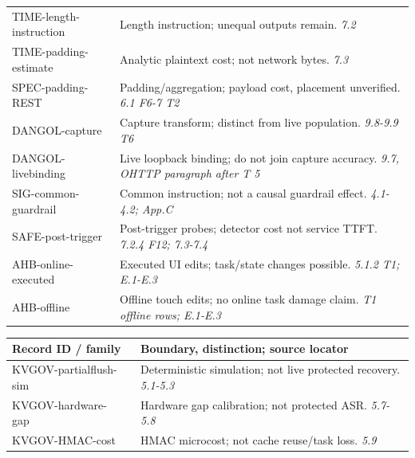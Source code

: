 \begin{table}[!t]
\begin{minipage}[t]{.492\textwidth}
\begin{tabularx}{\linewidth}{@{}p{.40\linewidth}X@{}}
TIME-\allowbreak{}length-\allowbreak{}instruction~\cite{timewilltell2024} & Length instruction; unequal outputs remain. \emph{7.2}\\
TIME-\allowbreak{}padding-\allowbreak{}estimate~\cite{timewilltell2024} & Analytic plaintext cost; not network bytes. \emph{7.3}\\
SPEC-\allowbreak{}padding-\allowbreak{}REST~\cite{wei2024speculation} & Padding/aggregation; payload cost, placement unverified. \emph{6.1 F6-7 T2}\\
DANGOL-\allowbreak{}capture~\cite{dangol2026workflow} & Capture transform; distinct from live population. \emph{9.8-9.9 T6}\\
DANGOL-\allowbreak{}livebinding~\cite{dangol2026workflow} & Live loopback binding; do not join capture accuracy. \emph{9.7, OHTTP paragraph after T 5}\\
SIG-\allowbreak{}common-\allowbreak{}guardrail~\cite{geng2026sigleak} & Common instruction; not a causal guardrail effect. \emph{4.1-4.2; App.C}\\
SAFE-\allowbreak{}post-\allowbreak{}trigger~\cite{chu2025safekv} & Post-trigger probes; detector cost not service TTFT. \emph{7.2.4 F12; 7.3-7.4}\\
AHB-\allowbreak{}online-\allowbreak{}executed~\cite{zhu2026turing} & Executed UI edits; task/state changes possible. \emph{5.1.2 T1; E.1-E.3}\\
AHB-\allowbreak{}offline~\cite{zhu2026turing} & Offline touch edits; no online task damage claim. \emph{T1 offline rows; E.1-E.3}\\
\bottomrule\end{tabularx}\end{minipage}
\hfill
\begin{minipage}[t]{.492\textwidth}\vspace{0pt}
\setlength{\tabcolsep}{2pt}\renewcommand{\arraystretch}{1.04}
\begin{tabularx}{\linewidth}{@{}p{.40\linewidth}X@{}}\toprule
Record ID / family & Boundary, distinction; source locator\\\midrule
KVGOV-\allowbreak{}partialflush-\allowbreak{}sim~\cite{addagada2026kvgov} & Deterministic simulation; not live protected recovery. \emph{5.1-5.3}\\
KVGOV-\allowbreak{}hardware-\allowbreak{}gap~\cite{addagada2026kvgov} & Hardware gap calibration; not protected ASR. \emph{5.7-5.8}\\
KVGOV-\allowbreak{}HMAC-\allowbreak{}cost~\cite{addagada2026kvgov} & HMAC microcost; not cache reuse/task loss. \emph{5.9}\\

\end{tabularx}
\end{minipage}
\end{table}
